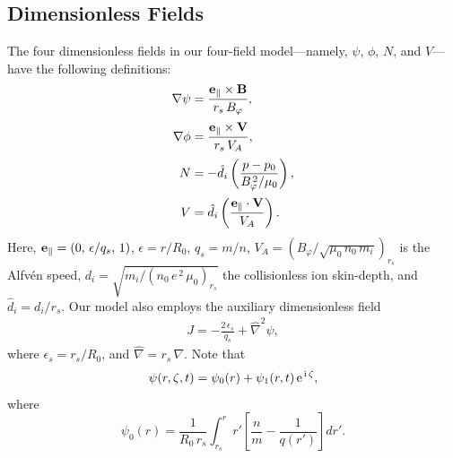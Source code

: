 \documentclass[12pt,prb,aps]{revtex4-1}
\begin{document}
\subsection{Dimensionless Fields}
The four  dimensionless fields in our four-field model---namely, $\psi$, $\phi$, $N$, and $V$---have the following
definitions:
\begin{align}\label{e10}
\nabla\psi &= \frac{{\bf e}_\parallel\times{\bf B}} {r_s\,B_\varphi},\\[0.5ex]
\nabla\phi &= \frac{{\bf e}_\parallel\times {\bf V}}{r_s\,V_A},\label{e40a}\\[0.5ex]
N &=-\hat{d}_i\left(\frac{p-p_0}{B_\varphi^{\,2}/\mu_0}\right),\\[0.5ex]
V &= \hat{d}_i\left(\frac{{\bf e}_\parallel\cdot {\bf V}}{V_A}\right).\label{e13}
\end{align}
Here,   ${\bf e}_\parallel = (0,\,\epsilon/q_s,\,1)$, $\epsilon = r/R_0$, $q_s=m/n$, 
$V_A =(B_\varphi/\sqrt{\mu_0\,n_0\,m_i})_{r_s}$ is the Alfv\'{e}n speed, 
$d_i = \sqrt{m_i/(n_0\,e^{\,2}\,\mu_0)_{r_s}}$ the collisionless ion skin-depth,
and $\hat{d}_i=d_i/r_s$. 
 Our
model also employs the auxiliary dimensionless  field
\begin{align}\label{e16}
J=-\frac{2\,\epsilon_s}{q_s}+\hat{\nabla}^2\psi,
\end{align}
where 
$\epsilon_s=r_s/R_0$, and $\hat{\nabla} = r_s\,\nabla$. Note that 
\begin{equation}\label{e44}
\psi(r,\zeta,t) = \psi_0(r)+ \psi_1(r,t)\,{\rm e}^{\,{\rm i}\,\zeta},
\end{equation}
where
\begin{equation}\label{e45}
\psi_0(r) = \frac{1}{R_0\,r_s}\int_{r_s}^r r'\left[\frac{n}{m}-\frac{1}{q(r')}\right]dr'.
\end{equation}
\end{document}
